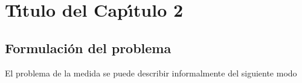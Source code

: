 \chapter{T\'{\i}tulo del Cap\'{\i}tulo 2}
\graphicspath{{figs/}}


\label{titulo-cap-2}


\section{Formulaci\'{o}n del problema}
\label{S:form-del-probl}

El problema de la medida se puede describir informalmente del siguiente modo 

